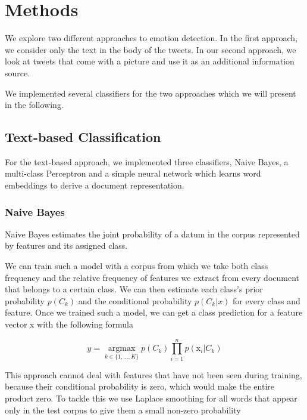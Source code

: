 \documentclass[11pt]{article}
\DeclareMathOperator*{\argmax}{argmax}
\begin{document}
\section{Methods}
\label{sec:methods}

We explore two different approaches to emotion detection.
In the first approach, we consider only the text in the body of the tweets.
In our second approach, we look at tweets that come with a picture and use it as
an additional information source.

We implemented several classifiers for the two approaches which we will present
in the following.

\subsection{Text-based Classification}

For the text-based approach, we implemented three classifiers, Naive Bayes, a
multi-class Perceptron and a simple neural network which learns word embeddings
to derive a document representation.

\subsubsection{Naive Bayes}
\label{sssec:naive_bayes}

Naive Bayes estimates the joint probability of a datum in the corpus represented
by features and its assigned class.

We can train such a model with a corpus from which we take both class frequency
and the relative frequency of features we extract from every document that
belongs to a certain class.
We can then estimate each class's prior probability $p(C_k)$ and the conditional
probability $p(C_k|x)$ for every class and feature. 
Once we trained such a model, we can get a class prediction for a feature vector
x with the following formula

\begin{equation}
  y = \underset{k\in\{1,\ldots,K\}}{\argmax}p(C_k)\prod_{i=1}^{n}p(\textrm{x}_i|C_k)
\end{equation}

This approach cannot deal with features that have not been seen during training,
because their conditional probability is zero, which would make the entire product
zero.
To tackle this we use Laplace smoothing for all words that appear only in the
test corpus to give them a small non-zero probability
\end{document}
